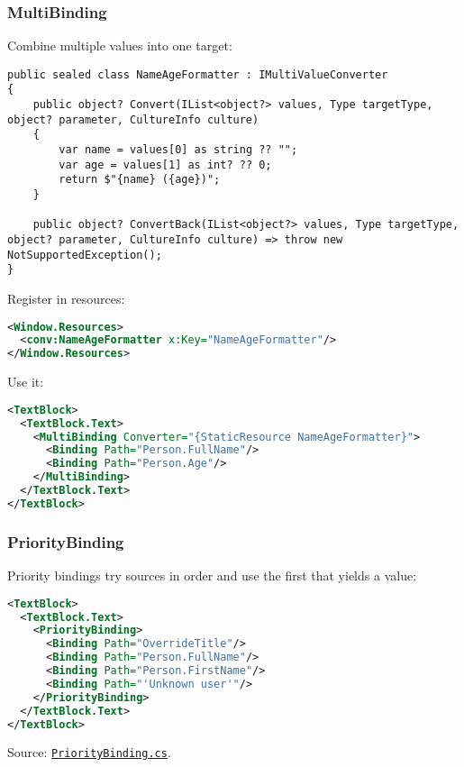 \subsubsection{MultiBinding}\label{multibinding}

Combine multiple values into one target:

\begin{lstlisting}
public sealed class NameAgeFormatter : IMultiValueConverter
{
    public object? Convert(IList<object?> values, Type targetType, object? parameter, CultureInfo culture)
    {
        var name = values[0] as string ?? "";
        var age = values[1] as int? ?? 0;
        return $"{name} ({age})";
    }

    public object? ConvertBack(IList<object?> values, Type targetType, object? parameter, CultureInfo culture) => throw new NotSupportedException();
}
\end{lstlisting}

Register in resources:

\begin{lstlisting}[language=XML]
<Window.Resources>
  <conv:NameAgeFormatter x:Key="NameAgeFormatter"/>
</Window.Resources>
\end{lstlisting}

Use it:

\begin{lstlisting}[language=XML]
<TextBlock>
  <TextBlock.Text>
    <MultiBinding Converter="{StaticResource NameAgeFormatter}">
      <Binding Path="Person.FullName"/>
      <Binding Path="Person.Age"/>
    </MultiBinding>
  </TextBlock.Text>
</TextBlock>
\end{lstlisting}

\subsubsection{PriorityBinding}\label{prioritybinding}

Priority bindings try sources in order and use the first that yields a
value:

\begin{lstlisting}[language=XML]
<TextBlock>
  <TextBlock.Text>
    <PriorityBinding>
      <Binding Path="OverrideTitle"/>
      <Binding Path="Person.FullName"/>
      <Binding Path="Person.FirstName"/>
      <Binding Path="'Unknown user'"/>
    </PriorityBinding>
  </TextBlock.Text>
</TextBlock>
\end{lstlisting}

Source:
\href{https://github.com/AvaloniaUI/Avalonia/blob/master/src/Markup/Avalonia.Markup/Data/PriorityBinding.cs}{\passthrough{\lstinline!PriorityBinding.cs!}}.

